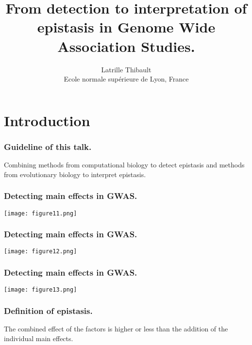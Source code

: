 \documentclass[10pt]{beamer}
\author[Latrille Thibault, ENS Lyon]{Latrille Thibault \\Ecole normale supérieure de Lyon, France}
\title[From detection to interpretation of epistasis in GWAS.]{From detection to interpretation of epistasis in Genome Wide Association Studies.}
\begin{document}
\frame{\titlepage} 

\section{Introduction}


\begin{frame}
\frametitle{Guideline of this talk.}

\begin{center}
\Large
Combining methods from computational biology to detect epistasis and methods from evolutionary biology to interpret epistasis.

\end{center}
\end{frame}

\begin{frame}
\frametitle{Detecting main effects in GWAS.}
	\begin{center}
       \texttt{[image: figure11.png]}
	\end{center}
\end{frame}

\begin{frame}
\frametitle{Detecting main effects in GWAS.}
	\begin{center}
       \texttt{[image: figure12.png]}
	\end{center}
\end{frame}

\begin{frame}
\frametitle{Detecting main effects in GWAS.}
	\begin{center}
       \texttt{[image: figure13.png]}
	\end{center}
\end{frame}

\begin{frame}
\frametitle{Definition of epistasis.}
\Large The combined effect of the factors is higher or less than the addition of the individual main effects.

\end{frame}
\end{document}
